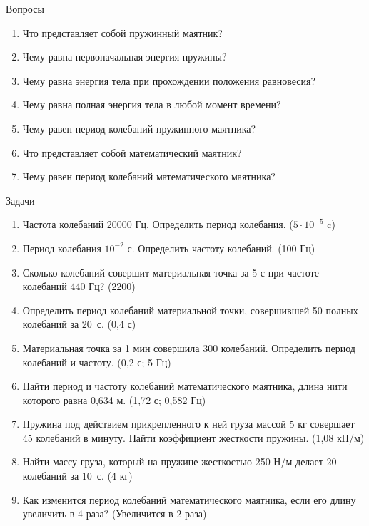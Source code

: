 \documentclass[a6paper, 11pt]{diss_4}
\renewcommand{\'}{\,'}
\begin{document}
\begin{center}
   Вопросы
\end{center}
\begin{enumerate}

\item Что представляет собой пружинный маятник?
\item Чему равна первоначальная энергия пружины?
\item Чему равна энергия тела при прохождении положения равновесия?
\item Чему равна полная энергия тела в любой момент времени?
\item Чему равен период колебаний пружинного маятника?
\item Что представляет собой математический маятник?
\item Чему равен период колебаний математического маятника?

\end{enumerate}

\begin{center}
   Задачи
\end{center}
\begin{enumerate}

\item Частота колебаний 20000 Гц. Определить период колебания. ($5\cdot10^{-5}$ c)
\item Период колебания $10^{-2}$ с. Определить частоту колебаний. (100 Гц)
\item Сколько колебаний совершит материальная точка за 5 с при частоте колебаний 440 Гц? (2200)
\item Определить период колебаний материальной точки, совершившей 50 полных колебаний за 20 с. (0,4 с)
\item Материальная точка за 1 мин совершила 300 колебаний. Определить период колебаний и частоту. (0,2 с;  5 Гц)
\item Найти период и частоту колебаний математического маятника, длина нити которого равна 0,634 м. (1,72 с;  0,582 Гц)
\item Пружина под действием прикрепленного к ней груза массой 5 кг совершает 45 колебаний в минуту. Найти коэффициент жесткости пружины. (1,08 кН/м)
\item Найти массу груза, который на пружине жесткостью 250 Н/м делает 20 колебаний за 10 с. (4 кг)
\item Как изменится период колебаний математического маятника, если его длину увеличить в 4 раза? (Увеличится в 2 раза)

\end{enumerate}
\end{document}
